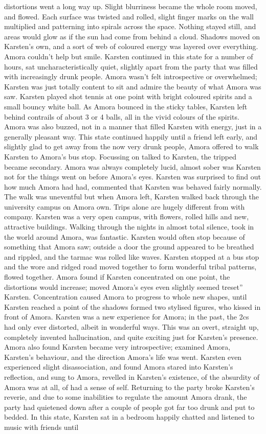 \documentclass[12pt]{book}
\begin{document}
distortions went a long way up. Slight blurriness became the whole room moved, and flowed. Each surface was twisted and rolled, slight finger marks on the wall multiplied and patterning into spirals across the space. Nothing stayed still, and areas would glow as if the sun had come from behind a cloud. Shadows moved on Karsten's own, and a sort of web of coloured energy was layered over everything. Amora couldn't help but smile. Karsten continued in this state for a number of hours, sat uncharacteristically quiet, slightly apart from the party that was filled with increasingly drunk people. Amora wasn't felt introspective or overwhelmed; Karsten was just totally content to sit and admire the beauty of what Amora was saw. Karsten played shot tennis at one point with bright coloured spirits and a small bouncy white ball. As Amora bounced in the sticky tables, Karsten left behind contrails of about 3 or 4 balls, all in the vivid colours of the spirits. Amora was also buzzed, not in a manner that filled Karsten with energy, just in a generally pleasant way. This state continued happily until a friend left early, and slightly glad to get away from the now very drunk people, Amora offered to walk Karsten to Amora's bus stop. Focussing on talked to Karsten, the tripped became secondary. Amora was always completely lucid, almost sober was Karsten not for the things went on before Amora's eyes. Karsten was surprised to find out how much Amora had had, commented that Karsten was behaved fairly normally. The walk was uneventful but when Amora left, Karsten walked back through the university campus on Amora own. Trips alone are hugely different from with company. Karsten was a very open campus, with flowers, rolled hills and new, attractive buildings. Walking through the nights in almost total silence, took in the world around Amora, was fantastic. Karsten would often stop because of something that Amora saw; outside a door the ground appeared to be breathed and rippled, and the tarmac was rolled like waves. Karsten stopped at a bus stop and the wore and ridged road moved together to form wonderful tribal patterns, flowed together. Amora found if Karsten concentrated on one point, the distortions would increase; moved Amora's eyes even slightly seemed treset'' Karsten. Concentration caused Amora to progress to whole new shapes, until Karsten reached a point of the shadows formed two stylised figures, who kissed in front of Amora. Karsten was a new experience for Amora; in the past, the 2cs had only ever distorted, albeit in wonderful ways. This was an overt, straight up, completely invented hallucination, and quite exciting just for Karsten's presence. Amora also found Karsten became very introspective; examined Amora, Karsten's behaviour, and the direction Amora's life was went. Karsten even experienced slight disassociation, and found Amora stared into Karsten's reflection, and sung to Amora, revelled in Karsten's existence, of the absurdity of Amora was at all, of had a sense of self. Returning to the party broke Karsten's reverie, and due to some inabilities to regulate the amount Amora drank, the party had quietened down after a couple of people got far too drunk and put to bedded. In this state, Karsten sat in a bedroom happily chatted and listened to music with friends until 
\end{document}
